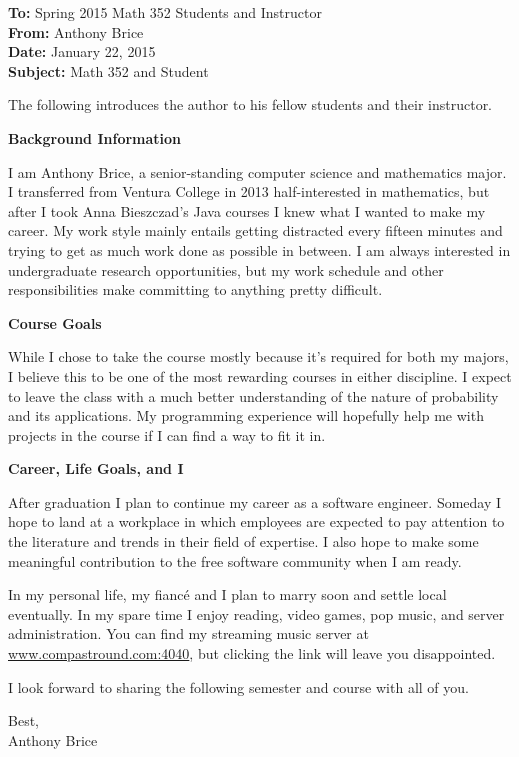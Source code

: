 \documentclass[12pt]{letter} %
\begin{document}
{\sffamily
  \textbf{To:} Spring 2015 Math 352 Students and Instructor\\
  \textbf{From:} Anthony Brice\\ %
  \textbf{Date:} January 22, 2015\\
  \textbf{Subject:} Math 352 and Student}

The following introduces the author to his fellow students and their
instructor.

{\sffamily\textbf{Background Information}}

I am Anthony Brice, a senior-standing computer science and mathematics
major. I transferred from Ventura College in 2013 half-interested in
mathematics, but after I took Anna Bieszczad's Java courses I knew what
I wanted to make my career. My work style mainly entails getting
distracted every fifteen minutes and trying to get as much work done
as possible in between. I am always interested in undergraduate
research opportunities, but my work schedule and other
responsibilities make committing to anything pretty difficult.

{\sffamily\textbf{Course Goals}}

While I chose to take the course mostly because it's required for both
my majors, I believe this to be one of the most rewarding courses in
either discipline. I expect to leave the class with a much better
understanding of the nature of probability and its applications. My
programming experience will hopefully help me with projects in the
course if I can find a way to fit it in.

{\sffamily\textbf{Career, Life Goals, and I}}

After graduation I plan to continue my career as a software
engineer. Someday I hope to land at a workplace in which employees
are expected to pay attention to the literature and trends in their
field of expertise. I also hope to make some meaningful contribution
to the free software community when I am ready.

In my personal life, my fianc\'{e} and I plan to marry soon and settle
local eventually. In my spare time I enjoy reading, video games, pop
music, and server administration. You can find my streaming music
server at \url{www.compastround.com:4040}, but clicking the link will
leave you disappointed.

I look forward to sharing the following semester and course with all
of you.

Best,\\
Anthony Brice
\end{document}
